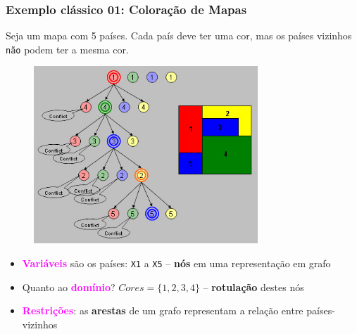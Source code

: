 \documentclass{beamer}
\begin{document}
\begin{frame}[fragile]

\frametitle{Exemplo clássico 01: Coloração de Mapas}

\begin{footnotesize}
Seja um mapa com 5 países. Cada país deve ter uma cor, mas os países
vizinhos \texttt{não} podem ter a mesma cor. 
\end{footnotesize}

\begin{figure}[!htb]
\begin{center}
\includegraphics[width=0.750\textwidth, height=0.50\textheight]{figures/coloracao_01.jpg}
\end{center}
\end{figure}

\begin{footnotesize}
\begin{itemize}
  \item \textcolor{magenta}{\textbf{Variáveis}} são os países: \texttt{X1} a \texttt{X5} -- \textbf{nós} em uma representação em grafo 
  \item Quanto ao  \textcolor{magenta}{\textbf{domínio}}? $Cores =\{1,2,3,4\}$ -- \textbf{rotulação} destes nós
  \item \textcolor{magenta}{\textbf{Restrições}}: as \textbf{arestas} de um grafo representam a relação entre países-vizinhos
\end{itemize}
\end{footnotesize}
    
\end{frame}
\end{document}
